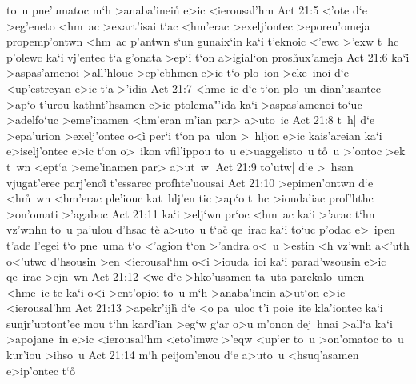 to~u
pne'umatoc
m`h
>anaba'inein\r{}
e>ic
<ierousal'hm\bibvsend
\vs Act 21:5
<'ote
d`e
>eg'eneto
<hm~ac
>exart'isai
t`ac
<hm'erac
>exelj'ontec
>eporeu'omeja
propemp'ontwn
<hm~ac
p'antwn
s`un
gunaix`in
ka`i
t'eknoic
<'ewc
>'exw
t~hc
p'olewc
ka`i
vj'entec
t`a
g'onata
>ep`i
t`on
a>igial`on
pros\r{h}ux'ameja\bibvsend
{}
\vs Act 21:6
ka`i\r{}
>aspas'amenoi
>all'hlouc
>ep'ebhmen
e>ic
t`o
plo~ion
>eke~inoi
d`e
<up'estreyan
e>ic
t`a
>'idia\bibvsend
\vs Act 21:7
<hme~ic
d`e
t`on
plo~un
dian'usantec
>ap`o
t'urou
kathnt'hsamen
e>ic
ptolema"'ida
ka`i
>aspas'amenoi
to`uc
>adelfo`uc
>eme'inamen
<hm'eran
m'ian
par>
a>uto~ic\bibvsend
\vs Act 21:8
t~h|
d`e
>epa'urion
>exelj'ontec
o<i\r{}
per`i
t`on
pa~ulon
>~hljon
e>ic
kais'areian
ka`i
e>iselj'ontec
e>ic
t`on
o>~ikon
vfil'ippou
to~u
e>uaggelisto~u
t\r{o}~u
>'ontoc
>ek
t~wn
<ept`a
>eme'inamen
par>
a>ut~w|\bibvsend
\vs Act 21:9
to'utw|
d`e
>~hsan
vjugat'erec
parj'enoi\r{}
t'essarec
profhte'uousai\bibvsend
\vs Act 21:10
>epimen'ontwn
d`e
<h\r{m}~wn
<hm'erac
ple'iouc
kat~hlj'en
tic
>ap`o
t~hc
>iouda'iac
prof'hthc
>on'omati
>'agaboc\bibvsend
\vs Act 21:11
ka`i
>elj`wn
pr`oc
<hm~ac
ka`i
>'arac
t`hn
vz'wnhn
to~u
pa'ulou
d'hsac
te\r{}
a>uto~u
t`ac\r{}
qe~irac
ka`i
to`uc
p'odac
e>~ipen
t'ade
l'egei
t`o
pne~uma
t`o
<'agion
t`on
>'andra
o<~u
>estin
<h
vz'wnh
a<'uth
o<'utwc
d'hsousin
>en
<ierousal`hm
o<i
>iouda~ioi
ka`i
parad'wsousin
e>ic
qe~irac
>ejn~wn\bibvsend
\vs Act 21:12
<wc
d`e
>hko'usamen
ta~uta
parekalo~umen
<hme~ic
te
ka`i
o<i
>ent'opioi
to~u
m`h
>anaba'inein
a>ut`on
e>ic
<ierousal'hm\bibvsend
\vs Act 21:13
>apekr'ijh\r{}
d`e
<o
pa~uloc
t'i
poie~ite
kla'iontec
ka`i
sunjr'uptont'ec
mou
t`hn
kard'ian
>eg`w
g`ar
o>u
m'onon
dej~hnai
>all`a
ka`i
>apojane~in
e>ic
<ierousal`hm
<eto'imwc
>'eqw
<up`er
to~u
>on'omatoc
to~u
kur'iou
>ihso~u\bibvsend
\vs Act 21:14
m`h
peijom'enou
d`e
a>uto~u
<hsuq'asamen
e>ip'ontec
t`o\r{}
